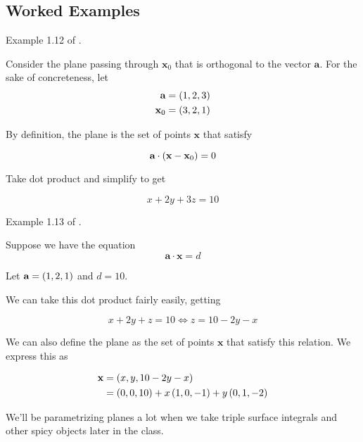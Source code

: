 \documentclass[11pt]{article}
\begin{document}
\subsection{Worked Examples}


\begin{example}
  
  Example 1.12 of \cite{carlen}.

  Consider the plane passing through $\bm{x}_0$ that is orthogonal to the vector $\bm{a}$.
  For the sake of concreteness, let
  \begin{align*}
    \textbf{a} &= \left ( 1, 2, 3 \right) \\
    \textbf{x}_0 &= \left ( 3, 2, 1 \right) \\
  \end{align*}

  By definition, the plane is the set of points $\bm{x}$ that satisfy
  
  $$
  \textbf{a} \cdot \left ( \textbf{x} - \textbf{x}_0 \right) = 0
  $$
  
  Take dot product and simplify to get
  
  $$
  x + 2y + 3z = 10
  $$
\end{example}


\begin{example}
  
  Example 1.13 of \cite{carlen}.

  Suppose we have the equation
  $$
  \bm{a} \cdot \bm{x} = d
  $$

  Let $\textbf{a} = \left ( 1, 2, 1  \right)$ and $d=10$.

  We can take this dot product fairly easily, getting

  $$
  x + 2y + z = 10 \iff z = 10 - 2y - x
  $$

  We can also define the plane as the set of points $\bm{x}$ that satisfy this relation.
  We express this as

  \begin{align*}
    \textbf{x} &= \left ( x, y, 10 - 2y - x \right) \\
    &= \left ( 0, 0, 10 \right) + x \left ( 1, 0, -1 \right) + y \left ( 0, 1, -2 \right) \\
  \end{align*}

  We'll be parametrizing planes a lot when we take triple surface integrals and other spicy objects later in the class.
\end{example}
\end{document}
